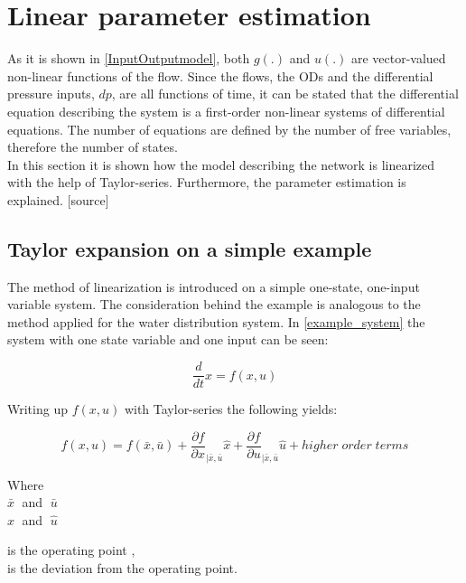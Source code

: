 \section{Linear parameter estimation} 
\label{LinParamEst}

As it is shown in \eqref{InputOutputmodel}, both $g(.)$ and $u(.)$ are vector-valued non-linear functions of the flow. Since the flows, the ODs and the differential pressure inputs, $dp$, are all functions of time, it can be stated that the differential equation describing the system is a first-order non-linear systems of differential equations. The number of equations are defined by the number of free variables, therefore the number of states.
\\
In this section it is shown how the model describing the network is linearized with the help of Taylor-series. Furthermore, the parameter estimation is explained. [source] 

\subsection{Taylor expansion on a simple example}
 \label{Taylorexamplesection}

The method of linearization is introduced on a simple one-state, one-input variable system. The consideration behind the example is analogous to the method applied for the water distribution system. In \eqref{example_system} the system with one state variable and one input can be seen: 

\begin{equation}
\frac{d}{dt} x = f(x,u)
 \label{example_system}
\end{equation}

Writing up $f(x,u)$ with Taylor-series the following yields: 

\begin{equation}
f(x,u) = f(\bar{x},\bar{u}) + \frac{\partial f}{\partial x}_{|\bar{x}, \bar{u}} \hat{x} + \frac{\partial f}{\partial u}_{|\bar{x}, \bar{u}} \hat{u} + higher \; order \; terms  
 \label{TaylorExpansion}
\end{equation}

\begin{minipage}[t]{0.20\textwidth}
Where\\
\hspace*{8mm} $\bar{x} \;$ and $\; \bar{u}$ \\
\hspace*{8mm} $\hat{x} \;$ and $\; \hat{u}$ 
\end{minipage}
\begin{minipage}[t]{0.68\textwidth}
\vspace*{2mm}
is the operating point ,\\
is the deviation from the operating point.
\end{minipage}

